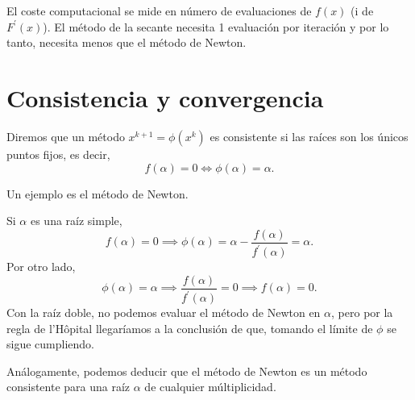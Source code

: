 \begin{center}
\end{center}

\begin{obs*}
    El coste computacional se mide en número de evaluaciones de $f(x)$ (i de $F^\prime(x)$).
    El método de la secante necesita 1 evaluación por iteración y por lo tanto, necesita menos que
    el método de Newton.
\end{obs*}

\section{Consistencia y convergencia}

\begin{defi}
    Diremos que un método $x^{k+1} = \phi\left( x^k \right)$ es consistente si las raíces son
    los únicos puntos fijos, es decir,
    \[
        f(\alpha) = 0 \iff \phi(\alpha) = \alpha.
    \]
\end{defi}

\begin{ej}
    Un ejemplo es el método de Newton.

    Si $\alpha$ es una raíz simple,
    \[
        f(\alpha) = 0 \implies \phi(\alpha) = \alpha - \frac{f(\alpha)}{f^\prime(\alpha)} = \alpha.
    \]
    Por otro lado,
    \[
        \phi(\alpha) = \alpha \implies \frac{f(\alpha)}{f^\prime(\alpha)} = 0 \implies f(\alpha) = 0.
    \]
    Con la raíz doble, no podemos evaluar el método de Newton en $\alpha$, pero por la regla de l'Hôpital llegaríamos
    a la conclusión de que, tomando el límite de $\phi$ se sigue cumpliendo.

    Análogamente, podemos deducir que el método de Newton es un método consistente para una raíz $\alpha$ de
    cualquier múltiplicidad.
\end{ej}

